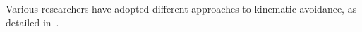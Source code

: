 \documentclass[letterpaper, 10 pt, conference]{ieeeconf}  %
\begin{document}
%
%
%
%
%
%
%
%
%

Various researchers have adopted different approaches to kinematic avoidance, as detailed in~\cite{c30, c39}.
\end{document}
